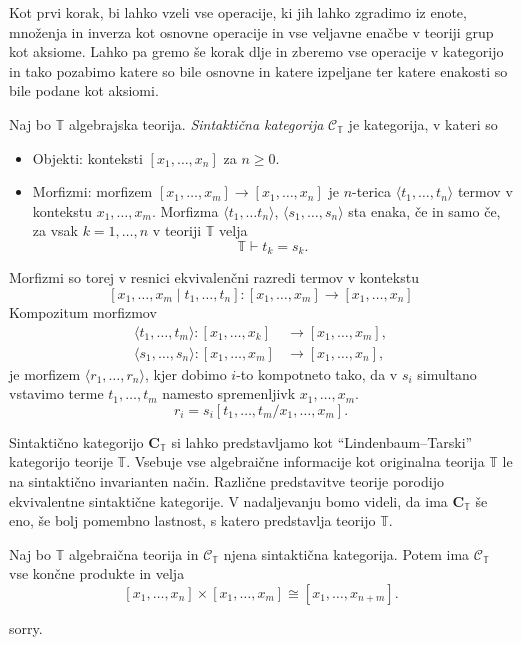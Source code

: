 \documentclass[../kategoricna_logika.tex]{subfiles}
\begin{document}
Kot prvi korak, bi lahko vzeli vse operacije, ki jih lahko zgradimo iz
enote, množenja in inverza kot osnovne operacije in vse
veljavne enačbe v teoriji grup kot aksiome. Lahko pa gremo še korak dlje
in zberemo vse operacije v kategorijo in tako pozabimo katere so bile
osnovne in katere izpeljane ter katere enakosti so bile podane kot aksiomi.
%
\begin{definicija}
  Naj bo $\mathbb{T}$ algebrajska teorija.
  \emph{Sintaktična kategorija} $\mathcal{C}_\mathbb{T}$ je kategorija,
  v kateri so
  \begin{itemize}
  \item Objekti: konteksti $[x_1, \ldots, x_n]$ za $n \geq 0$.
%
  \item Morfizmi: morfizem $[x_1, \ldots, x_m] \to [x_1, \ldots, x_n]$
    je $n$-terica $\langle t_1, \ldots, t_n \rangle$ termov v kontekstu
    $x_1, \ldots, x_m$. Morfizma $\langle t_1, \ldots t_n \rangle$,
    $\langle s_1, \ldots, s_n \rangle$ sta enaka, če in samo če, za vsak
    $k = 1, \ldots, n$ v teoriji $\mathbb{T}$ velja
    $$\mathbb{T} \vdash t_k = s_k.$$
\end{itemize}
%
Morfizmi so torej v resnici ekvivalenčni razredi termov v kontekstu
$$[x_1, \ldots, x_m \mid t_1, \ldots, t_n] : [x_1, \ldots, x_m] \to [x_1, \ldots, x_n]$$
%
Kompozitum morfizmov
  \begin{align*}
    \langle t_1, \ldots, t_m \rangle : [x_1, \ldots, x_k] &\to [x_1, \ldots, x_m], \\
    \langle s_1, \ldots, s_n \rangle : [x_1, \ldots, x_m] &\to [x_1, \ldots, x_n],
  \end{align*}
je morfizem $\langle r_1, \ldots, r_n \rangle$, kjer dobimo $i$-to kompotneto tako,
da v $s_i$ simultano vstavimo terme $t_1, \ldots, t_m$ namesto
spremenljivk $x_1, \ldots, x_m$.
$$r_i = s_i[t_1, \ldots, t_m / x_1, \ldots, x_m].$$
%
\end{definicija}
Sintaktično kategorijo $\mathbf{C}_{\mathbb{T}}$ si lahko predstavljamo kot
``Lindenbaum--Tarski'' kategorijo teorije $\mathbb{T}$. Vsebuje vse algebraične
informacije kot originalna teorija $\mathbb{T}$ le na sintaktično invarianten način.
Različne predstavitve teorije porodijo ekvivalentne sintaktične
kategorije. V nadaljevanju bomo videli, da ima $\mathbf{C}_{\mathbb{T}}$ še eno,
še bolj pomembno lastnost, s katero predstavlja teorijo $\mathbb{T}$.
%
\begin{lema}
  Naj bo $\mathbb{T}$ algebraična teorija in $\mathcal{C}_\mathbb{T}$
  njena sintaktična kategorija. Potem ima $\mathcal{C}_\mathbb{T}$ vse
  končne produkte in velja
$$[x_1, \ldots, x_n] \times [x_1, \ldots, x_m] \cong [x_1, \ldots, x_{n+m}].$$
\end{lema}
\begin{dokaz}
sorry.
\end{dokaz}
%
%
\end{document}
